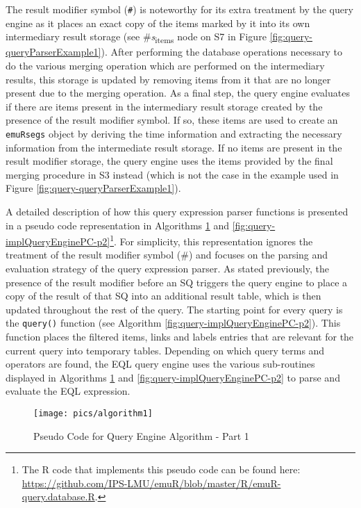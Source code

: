 \documentclass[
]{book}
\begin{document}
The result modifier symbol (\texttt{\#}) is noteworthy for its extra treatment by the query engine as it places an exact copy of the items marked by it into its own intermediary result storage (see \#\emph{s}\textsubscript{items} node on S7 in Figure \ref{fig:query-queryParserExample1}). After performing the database operations necessary to do the various merging operation which are performed on the intermediary results, this storage is updated by removing items from it that are no longer present due to the merging operation. As a final step, the query engine evaluates if there are items present in the intermediary result storage created by the presence of the result modifier symbol. If so, these items are used to create an \texttt{emuRsegs} object by deriving the time information and extracting the necessary information from the intermediate result storage. If no items are present in the result modifier storage, the query engine uses the items provided by the final merging procedure in S3 instead (which is not the case in the example used in Figure \ref{fig:query-queryParserExample1}).

A detailed description of how this query expression parser functions is presented in a pseudo code representation in Algorithms \ref{fig:query-implQueryEnginePC-p1} and \ref{fig:query-implQueryEnginePC-p2}\footnote{The R code that implements this pseudo code can be found here: \url{https://github.com/IPS-LMU/emuR/blob/master/R/emuR-query.database.R}.}. For simplicity, this representation ignores the treatment of the result modifier symbol (\#) and focuses on the parsing and evaluation strategy of the query expression parser. As stated previously, the presence of the result modifier before an SQ triggers the query engine to place a copy of the result of that SQ into an additional result table, which is then updated throughout the rest of the query. The starting point for every query is the \texttt{query()} function (see Algorithm \ref{fig:query-implQueryEnginePC-p2}). This function places the filtered items, links and labels entries that are relevant for the current query into temporary tables. Depending on which query terms and operators are found, the EQL query engine uses the various sub-routines displayed in Algorithms \ref{fig:query-implQueryEnginePC-p1} and \ref{fig:query-implQueryEnginePC-p2} to parse and evaluate the EQL expression.

\begin{figure}

{\centering \texttt{[image: pics/algorithm1]} 

}

\caption{Pseudo Code for Query Engine Algorithm - Part 1}\label{fig:query-implQueryEnginePC-p1}
\end{figure}
\end{document}
